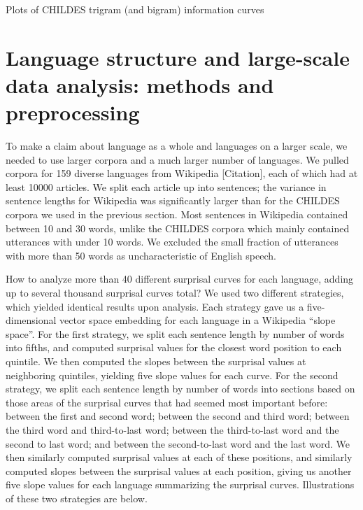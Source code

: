 \documentclass[11pt,]{article}
\begin{document}
Plots of CHILDES trigram (and bigram) information curves

\hypertarget{language-structure-and-large-scale-data-analysis-methods-and-preprocessing}{%
\section{Language structure and large-scale data analysis: methods and preprocessing}\label{language-structure-and-large-scale-data-analysis-methods-and-preprocessing}}

To make a claim about language as a whole and languages on a larger scale, we needed to use larger corpora and a much larger number of languages. We pulled corpora for 159 diverse languages from Wikipedia {[}Citation{]}, each of which had at least 10000 articles. We split each article up into sentences; the variance in sentence lengths for Wikipedia was significantly larger than for the CHILDES corpora we used in the previous section. Most sentences in Wikipedia contained between 10 and 30 words, unlike the CHILDES corpora which mainly contained utterances with under 10 words. We excluded the small fraction of utterances with more than 50 words as uncharacteristic of English speech.

How to analyze more than 40 different surprisal curves for each language, adding up to several thousand surprisal curves total? We used two different strategies, which yielded identical results upon analysis. Each strategy gave us a five-dimensional vector space embedding for each language in a Wikipedia ``slope space''. For the first strategy, we split each sentence length by number of words into fifths, and computed surprisal values for the closest word position to each quintile. We then computed the slopes between the surprisal values at neighboring quintiles, yielding five slope values for each curve. For the second strategy, we split each sentence length by number of words into sections based on those areas of the surprisal curves that had seemed most important before: between the first and second word; between the second and third word; between the third word and third-to-last word; between the third-to-last word and the second to last word; and between the second-to-last word and the last word. We then similarly computed surprisal values at each of these positions, and similarly computed slopes between the surprisal values at each position, giving us another five slope values for each language summarizing the surprisal curves. Illustrations of these two strategies are below.
\end{document}

